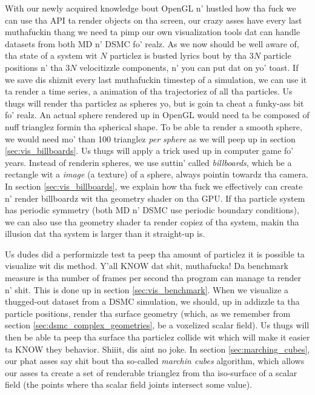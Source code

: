 With our newly acquired knowledge bout OpenGL n' hustled how tha fuck we can use tha API ta render objects on tha screen, our crazy asses have every last muthafuckin thang we need ta pimp our own visualization tools dat can handle datasets from both MD n' DSMC fo' realz. As we now should be well aware of, tha state of a system wit $N$ particlez is busted lyrics bout by tha $3N$ particle positions n' tha $3N$ velocitizzle components, n' you can put dat on yo' toast. If we save dis shiznit every last muthafuckin timestep of a simulation, we can use it ta render a time series, a animation of tha trajectoriez of all tha particles. Us thugs will render tha particlez as spheres yo, but is goin ta cheat a funky-ass bit fo' realz. An actual sphere rendered up in OpenGL would need ta be composed of nuff trianglez formin tha spherical shape. To be able ta render a smooth sphere, we would need mo' than 100 trianglez \textit{per sphere} as we will peep up in section \ref{sec:vis_billboards}. Us thugs will apply a trick used up in computer game fo' years. Instead of renderin spheres, we use suttin' called \textit{billboards}, which be a rectangle wit a \textit{image} (a texture) of a sphere, always pointin towardz tha camera. In section \ref{sec:vis_billboards}, we explain how tha fuck we effectively can create n' render billboardz wit tha geometry shader on tha GPU. If tha particle system has periodic symmetry (both MD n' DSMC use periodic boundary conditions), we can also use tha geometry shader ta render copiez of tha system, makin tha illusion dat tha system is larger than it straight-up is.

Us dudes did a performizzle test ta peep tha amount of particlez it is possible ta visualize wit dis method. Y'all KNOW dat shit, muthafucka! Da benchmark measure is tha number of frames per second tha program can manage ta render n' shit. This is done up in section \ref{sec:vis_benchmark}. When we visualize a thugged-out dataset from a DSMC simulation, we should, up in addizzle ta tha particle positions, render tha surface geometry (which, as we remember from section \ref{sec:dsmc_complex_geometries}, be a voxelized scalar field). Us thugs will then be able ta peep tha surface tha particlez collide wit which will make it easier ta KNOW they behavior. Shiiit, dis aint no joke. In section \ref{sec:marching_cubes}, our phat asses say shit bout tha so-called \textit{marchin cubes} algorithm, which allows our asses ta create a set of renderable trianglez from tha iso-surface of a scalar field (the points where tha scalar field joints intersect some value).